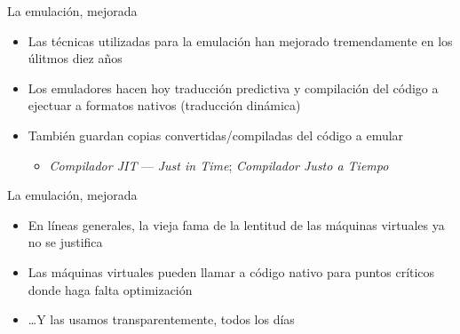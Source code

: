 \documentclass[presentation]{beamer}
\begin{document}
\begin{frame}[label={sec:org3d2e6c4}]{La emulación, mejorada}
\begin{itemize}
\item Las técnicas utilizadas para la emulación han mejorado tremendamente
en los úlitmos diez años
\item Los emuladores hacen hoy traducción predictiva y compilación del
código a ejectuar a formatos nativos (traducción dinámica)
\item También guardan copias convertidas/compiladas del código a emular
\begin{itemize}
\item \emph{Compilador JIT} — \emph{Just in Time}; \emph{Compilador Justo a Tiempo}
\end{itemize}
\end{itemize}
\end{frame}

\begin{frame}[label={sec:org8e2ab8c}]{La emulación, mejorada}
\begin{itemize}
\item En líneas generales, la vieja fama de la lentitud de las máquinas
virtuales ya no se justifica
\item Las máquinas virtuales pueden llamar a código nativo para puntos
críticos donde haga falta optimización
\item \ldots{}Y las usamos transparentemente, todos los días
\end{itemize}
\end{frame}
\end{document}
